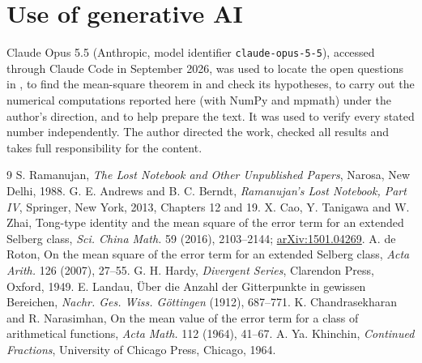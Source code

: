 \documentclass[11pt]{article}
\theoremstyle{remark}
\begin{document}
\section*{Use of generative AI}
Claude Opus 5.5 (Anthropic, model identifier \texttt{claude-opus-5-5}), accessed through Claude Code in September 2026, was used to
locate the open questions in \cite{AB4}, to find the mean-square theorem in \cite{CTZ} and check its hypotheses, to carry out the
numerical computations reported here (with NumPy and mpmath) under the author's direction, and to help prepare the text. It was used
to verify every stated number independently. The author directed the work, checked all results and takes full responsibility for
the content.

\begin{thebibliography}{9}
 S. Ramanujan, \emph{The Lost Notebook and Other Unpublished Papers}, Narosa, New Delhi, 1988.
 G. E. Andrews and B. C. Berndt, \emph{Ramanujan's Lost Notebook, Part IV}, Springer, New York, 2013, Chapters 12 and 19.
 X. Cao, Y. Tanigawa and W. Zhai, Tong-type identity and the mean square of the error term for an extended Selberg class,
\emph{Sci. China Math.} 59 (2016), 2103--2144; \href{https://arxiv.org/abs/1501.04269}{arXiv:1501.04269}.
 A. de Roton, On the mean square of the error term for an extended Selberg class, \emph{Acta Arith.} 126 (2007), 27--55.
 G. H. Hardy, \emph{Divergent Series}, Clarendon Press, Oxford, 1949.
 E. Landau, \"Uber die Anzahl der Gitterpunkte in gewissen Bereichen, \emph{Nachr. Ges. Wiss. G\"ottingen} (1912),
687--771.
 K. Chandrasekharan and R. Narasimhan, On the mean value of the error term for a class of arithmetical functions,
\emph{Acta Math.} 112 (1964), 41--67.
 A. Ya. Khinchin, \emph{Continued Fractions}, University of Chicago Press, Chicago, 1964.
\end{thebibliography}
\end{document}
